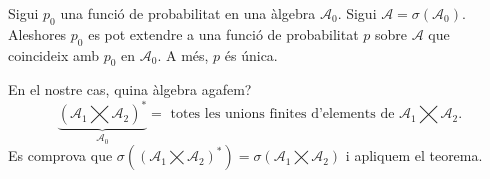 \begin{thm}
  Sigui $p_{0}$ una funció de probabilitat en una àlgebra $\mathcal{A}_{0}$. Sigui $\mathcal{A} = \sigma(\mathcal{A}_{0})$. \\
  Aleshores $p_{0}$ es pot extendre a una funció de probabilitat $p$ sobre $\mathcal{A}$ que coincideix amb $p_{0}$ en $\mathcal{A}_{0}$. A més, $p$ és única.
\end{thm}

En el nostre cas, quina àlgebra agafem? 
\[
    \underbrace{(\mathcal{A}_{1}\bigtimes\mathcal{A}_{2})^{*}}_{\mathcal{A}_{0}} = \text{ totes les unions finites d'elements de } \mathcal{A}_{1}\bigtimes\mathcal{A}_{2}.
\]
Es comprova que $\sigma((\mathcal{A}_{1}\bigtimes\mathcal{A}_{2})^{*}) = \sigma(\mathcal{A}_{1}\bigtimes\mathcal{A}_{2})$ i apliquem el teorema.
